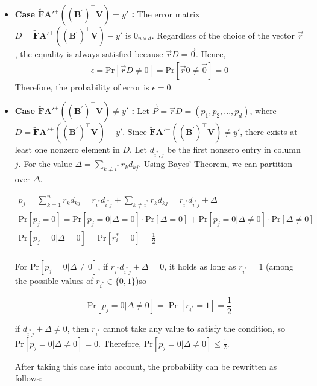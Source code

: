\documentclass[11pt]{article}
\begin{document}
\begin{itemize}
    \item \textbf{Case $\mathbf{\tilde F{A'}^+}((\mathbf{B}^{'})^\top \mathbf{V})=y'$ :} The error matrix $D= \mathbf{\tilde F{A'}^+}((\mathbf{B}^{'})^\top \mathbf{V}) -y'$ is $0_{n\times d}$. Regardless of the choice of the vector $\vec{r}$, the equality is always satisfied because $\vec{r}D=\vec{0}$. Hence, 
    \[ \label{neqzero}
    \begin{split}
        \epsilon = \text{Pr}[\vec{r}D\neq 0] = \text{Pr}[\vec{r}0\neq \vec{0}] = 0
    \end{split}
    \]
    Therefore, the probability of error is $\epsilon=0$.
    \item \textbf{Case $\mathbf{\tilde F{A'}^+}((\mathbf{B}^{'})^\top \mathbf{V})\neq y'$ : } Let $\vec{P} = \vec{r}D= (p_1,p_2,...,p_d)$, where $D = \mathbf{\tilde F{A'}^+}((\mathbf{B}^{'})^\top \mathbf{V}) - y'.$ Since $\mathbf{\tilde F{A'}^+}((\mathbf{B}^{'})^\top \mathbf{V})\neq y'$, there exists at least one nonzero element in $D$. Let $d_{i^*,j}$ be the first nonzero entry in column $j$. For the value $\Delta=\sum_{k\neq i^*} r_kd_{kj}$. Using Bayes' Theorem, we can partition over $\Delta$.

    \[ \label{neqzero}
    \begin{split}
        p_j=\sum_{k=1}^n r_k d_{kj}= r_{i^*} d_{i^* j} + \sum_{k\neq i^*} r_k d_{kj} = r_{i^*} d_{i^* j} + \Delta \\
        \text{Pr}[p_j=0]=\text{Pr}[p_j=0|\Delta=0]\cdot \text{Pr}[\Delta=0] + \text{Pr}[p_j=0|\Delta\neq0]\cdot \text{Pr}[\Delta\neq 0] \\
        \text{Pr}[p_j=0|\Delta=0]=\text{Pr}[r_i^*=0]=\frac{1}{2} \\
    \end{split}
    \]

    For $\text{Pr}[p_j=0|\Delta\neq0]$, if $r_{i^*}d_{i^*j} + \Delta = 0$, it holds as long as $r_{i^*}=1$ (among the possible values of $r_{i^*} \in \{0,1\}$)so 
    
    \[
        \text{Pr}[p_j=0|\Delta\neq0] = \Pr[r_{i^*}=1] = \frac{1}{2}
    \]
        
    if $d_{i^*j} + \Delta \neq 0$, then $r_{i^*}$ cannot take any value to satisfy the condition, so $\text{Pr}[p_j=0|\Delta\neq0] = 0$. Therefore, $\text{Pr}[p_j=0|\Delta\neq0] \le \frac{1}{2}$.

    After taking this case into account, the probability can be rewritten as follows:


\end{itemize}
\end{document}
